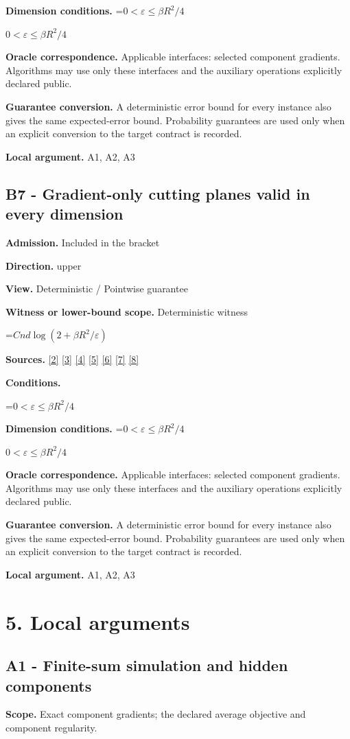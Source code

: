 \documentclass[10pt,a4paper]{article}
\newcommand{\AtlasMath}[1]{\par\begingroup\centering\setbox0=\hbox{$\displaystyle #1$}\ifdim\wd0>1.4\linewidth\typeout{ATLAS WIDE FORMULA: \the\wd0}\fi\ifdim\wd0>\linewidth\resizebox{\linewidth}{!}{\box0}\else\box0\fi\par\endgroup}
\newcommand{\AtlasInlineMath}[1]{\begingroup\setbox0=\hbox{$#1$}\ifdim\wd0>.4\linewidth\endgroup\AtlasMath{#1}\else\endgroup$#1$\fi}
\begin{document}
\textbf{Dimension conditions.} \AtlasInlineMath{0<\varepsilon\le\beta R^2/4}

\textbf{Oracle correspondence.} Applicable interfaces: selected component gradients. Algorithms may use only these interfaces and the auxiliary operations explicitly declared public.

\textbf{Guarantee conversion.} A deterministic error bound for every instance also gives the same expected-error bound. Probability guarantees are used only when an explicit conversion to the target contract is recorded.

\textbf{Local argument.} A1, A2, A3

\subsection{B7 - Gradient-only cutting planes valid in every dimension}
\textbf{Admission.} Included in the bracket

\textbf{Direction.} upper

\textbf{View.} Deterministic / Pointwise guarantee

\textbf{Witness or lower-bound scope.} Deterministic witness

\AtlasMath{Cnd\log(2+\beta R^2/\varepsilon)}
\textbf{Sources.} \href{https://proceedings.mlr.press/v97/zhou19b/zhou19b.pdf}{[2]} \href{https://arxiv.org/pdf/1405.4980}{[3]} \href{https://arxiv.org/pdf/2101.09740v2}{[4]} \href{https://arxiv.org/pdf/2609.33360v2}{[5]} \href{https://arxiv.org/pdf/2609.10874}{[6]} \href{https://www2.isye.gatech.edu/~nemirovs/MOR_AccuracyCertificates.pdf}{[7]} \href{https://arxiv.org/pdf/2609.20701}{[8]}

\textbf{Conditions.} 
\AtlasMath{0<\varepsilon\le\beta R^2/4}


\textbf{Dimension conditions.} \AtlasInlineMath{0<\varepsilon\le\beta R^2/4}

\textbf{Oracle correspondence.} Applicable interfaces: selected component gradients. Algorithms may use only these interfaces and the auxiliary operations explicitly declared public.

\textbf{Guarantee conversion.} A deterministic error bound for every instance also gives the same expected-error bound. Probability guarantees are used only when an explicit conversion to the target contract is recorded.

\textbf{Local argument.} A1, A2, A3

\section{5. Local arguments}
\subsection{A1 - Finite-sum simulation and hidden components}
\textbf{Scope.} Exact component gradients; the declared average objective and component regularity.
\end{document}
